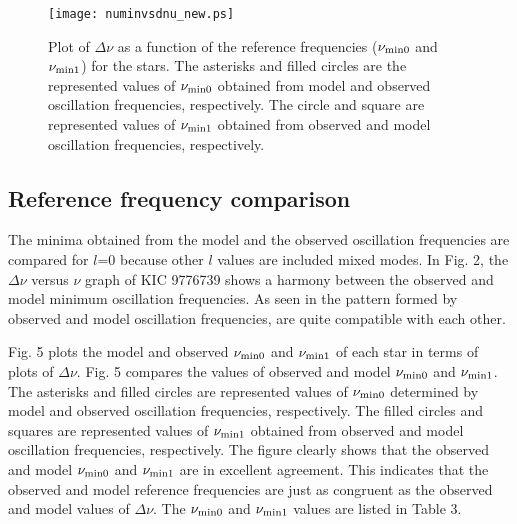 \documentclass[a4paper,fleqn,usenatbib]{mnras}     %
\begin{document}
{\begin{figure}
\begin{center}
\texttt{[image: numinvsdnu\_new.ps]}
        \caption{Plot of $\Delta\nu$ as a function of the  reference frequencies (${{\nu_{\rm min0}}}$ and ${{\nu_{\rm min1}}}$) for the stars. The asterisks and filled circles are the represented values of ${{\nu_{\rm min0}}}$ obtained from model and observed oscillation frequencies, respectively. The circle and square are represented values of ${{\nu_{\rm min1}}}$ obtained from observed and model oscillation frequencies, respectively.}
\end{center}
\end{figure}

\subsection{Reference frequency comparison}
The minima obtained from the model and the observed oscillation frequencies are compared for $l$=0 because other $l$ values are included mixed modes.
 In Fig. 2, the $\Delta\nu$ versus $\nu$ 
graph of KIC 9776739 shows a 
harmony between the observed and model minimum oscillation frequencies.
As seen in the pattern formed by observed 
and model oscillation frequencies, are 
quite compatible with each other.

Fig. 5 plots the model and observed 
${{\nu_{\rm min0}}}$ and ${{\nu_{\rm min1}}}$ of each star 
in terms of plots of $\Delta\nu$.
Fig. 5 compares the values of observed and model ${{\nu_{\rm min0}}}$ and ${{\nu_{\rm min1}}}$. 
The asterisks and filled circles are represented 
values of ${{\nu_{\rm min0}}}$ determined by 
model and observed oscillation frequencies, respectively. 
The filled circles and squares are represented values 
of ${{\nu_{\rm min1}}}$ obtained from observed and model oscillation frequencies, respectively.
The figure clearly shows 
that the observed and model ${{\nu_{\rm min0}}}$ and ${{\nu_{\rm min1}}}$
are in excellent agreement.
This indicates that the observed and model reference frequencies 
are just as congruent as the observed and model values of $\Delta\nu$.
The ${{\nu_{\rm min0}}}$ and ${{\nu_{\rm min1}}}$ values
 are listed in Table 3.

}
\end{document}
